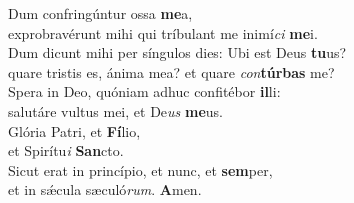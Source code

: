 \evenverse Dum confringúntur ossa \textbf{me}a,~\*\\
\evenverse exprobravérunt mihi qui tríbulant me inimí\textit{ci} \textbf{me}i.\\
\oddverse Dum dicunt mihi per síngulos dies: Ubi est Deus \textbf{tu}us?~\*\\
\oddverse quare tristis es, ánima mea? et quare \textit{con}\textbf{túr}\textbf{bas} me?\\
\evenverse Spera in Deo, quóniam adhuc confitébor \textbf{il}li:~\*\\
\evenverse salutáre vultus mei, et De\textit{us} \textbf{me}us.\\
\oddverse Glória Patri, et \textbf{Fí}lio,~\*\\
\oddverse et Spirítu\textit{i} \textbf{San}cto.\\
\evenverse Sicut erat in princípio, et nunc, et \textbf{sem}per,~\*\\
\evenverse et in sǽcula sæculó\textit{rum}. \textbf{A}men.\\
